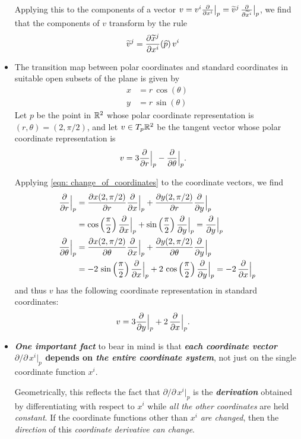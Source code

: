 \documentclass[11pt]{article}
\begin{document}
\begin{itemize}
Applying this to the components of a vector $v = v^i \frac{\partial }{ \partial x^{i}}\big|_{p} = \widetilde{v}^j \,\frac{\partial }{ \partial \widetilde{x}^{i}}\big|_{p}$, we find that the components of $v$ transform by the rule
\begin{align}
\widetilde{v}^{j} &= \frac{\partial \widetilde{x}^{j}}{ \partial x^{i}}(\widehat{p})\,v^i   \label{eqn: change_of_coordinates_full}
\end{align}

\item
\begin{example}
The transition map between polar coordinates and standard coordinates in suitable open subsets of the plane is given by 
\begin{align*}
x &=  r\,\cos(\theta) \\
y &=  r\,\sin(\theta) 
\end{align*} Let $p$ be the point in ${\mathbb R}^2$ whose polar coordinate representation is $(r, \theta) = (2, \pi/2)$, and let $v \in T_{p} {\mathbb R}^2$ be the tangent vector whose polar coordinate representation is
\begin{align*}
v &= 3\frac{\partial }{ \partial r}\Bigr|_{p} - \frac{\partial }{ \partial \theta}\Bigr|_{p}.
\end{align*}

Applying \eqref{eqn: change_of_coordinates} to the coordinate vectors, we find
\begin{align*}
\frac{\partial }{ \partial r}\Bigr|_{p} &= \frac{\partial x(2, \pi/2)}{ \partial r}\frac{\partial }{ \partial x}\Bigr|_{p} + \frac{\partial y(2, \pi/2)}{ \partial r}\frac{\partial }{ \partial y}\Bigr|_{p} \\
&= \cos\left(\frac{\pi}{2}\right)\frac{\partial }{ \partial x}\Bigr|_{p} + \sin\left(\frac{\pi}{2}\right)\frac{\partial }{ \partial y}\Bigr|_{p} = \frac{\partial }{ \partial y}\Bigr|_{p} \\
\frac{\partial }{ \partial \theta}\Bigr|_{p} &= \frac{\partial x(2, \pi/2)}{ \partial \theta}\frac{\partial }{ \partial x}\Bigr|_{p} + \frac{\partial y(2, \pi/2)}{ \partial \theta}\frac{\partial }{ \partial y}\Bigr|_{p} \\
&= -2\,\sin\left(\frac{\pi}{2}\right)\frac{\partial }{ \partial x}\Bigr|_{p}  + 2\,\cos\left(\frac{\pi}{2}\right)\frac{\partial }{ \partial y}\Bigr|_{p}
=-2\,\frac{\partial }{ \partial x}\Bigr|_{p} 
\end{align*} and thus $v$ has the following coordinate representation in standard coordinates:
\begin{align*}
v &= 3\frac{\partial }{ \partial y}\Bigr|_{p} + 2\,\frac{\partial }{ \partial x}\Bigr|_{p}.
\end{align*}
\end{example}

\item \emph{\textbf{One important fact}} to bear in mind is that \textbf{\emph{each coordinate vector} $\partial /\partial\,x^i\big|_{p}$ depends on \emph{the entire coordinate system}}, not just on the single coordinate function $x^i$. 

Geometrically, this reflects the fact that $\partial /\partial\,x^i\big|_{p}$ is the \emph{\textbf{derivation}} obtained by differentiating with respect to $x^i$ while \emph{all the other coordinates} are held \emph{constant}. If the coordinate functions other than $x^i$ \emph{are changed}, then the \emph{direction} of this \emph{coordinate derivative can change}.
\end{itemize}
\end{document}
